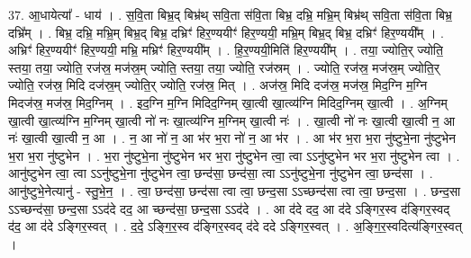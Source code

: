\documentclass[17pt]{extarticle}
\begin{document}
37. आ॒धायेत्या᳚ - धाय॑ । . स॒वि॒ता बिभ्र॒द् बिभ्र॑थ् सवि॒ता स॑वि॒ता बिभ्र॒ दभ्रि॒ मभ्रि॒म् बिभ्र॑थ् सवि॒ता स॑वि॒ता बिभ्र॒ दभ्रि᳚म् । . बिभ्र॒ दभ्रि॒ मभ्रि॒म् बिभ्र॒द् बिभ्र॒ दभ्रिꣳ॑ हिर॒ण्ययीꣳ॑ हिर॒ण्ययी॒ मभ्रि॒म् बिभ्र॒द् बिभ्र॒ दभ्रिꣳ॑ हिर॒ण्ययी᳚म् । . अभ्रिꣳ॑ हिर॒ण्ययीꣳ॑ हिर॒ण्ययी॒ मभ्रि॒ मभ्रिꣳ॑ हिर॒ण्ययी᳚म् । . हि॒र॒ण्ययी॒मिति॑ हिर॒ण्ययी᳚म् । . तया॒ ज्योति॒र् ज्योति॒ स्तया॒ तया॒ ज्योति॒ रज॑स्र॒ मज॑स्र॒म् ज्योति॒ स्तया॒ तया॒ ज्योति॒ रज॑स्रम् । . ज्योति॒ रज॑स्र॒ मज॑स्र॒म् ज्योति॒र् ज्योति॒ रज॑स्र॒ मिदि दज॑स्र॒म् ज्योति॒र् ज्योति॒ रज॑स्र॒ मित् । . अज॑स्र॒ मिदि दज॑स्र॒ मज॑स्र॒ मिद॒ग्नि म॒ग्नि मिदज॑स्र॒ मज॑स्र॒ मिद॒ग्निम् । . इद॒ग्नि म॒ग्नि मिदिद॒ग्निम् खा॒त्वी खा॒त्व्य॑ग्नि मिदिद॒ग्निम् खा॒त्वी । . अ॒ग्निम् खा॒त्वी खा॒त्व्य॑ग्नि म॒ग्निम् खा॒त्वी नो॑ नः खा॒त्व्य॑ग्नि म॒ग्निम् खा॒त्वी नः॑ । . खा॒त्वी नो॑ नः खा॒त्वी खा॒त्वी न॒ आ नः॑ खा॒त्वी खा॒त्वी न॒ आ । . न॒ आ नो॑ न॒ आ भ॑र भ॒रा नो॑ न॒ आ भ॑र । . आ भ॑र भ॒रा भ॒रा नु॑ष्टुभे॒ना नु॑ष्टुभेन भ॒रा भ॒रा नु॑ष्टुभेन । . भ॒रा नु॑ष्टुभे॒ना नु॑ष्टुभेन भर भ॒रा नु॑ष्टुभेन त्वा॒ त्वा ऽऽनु॑ष्टुभेन भर भ॒रा नु॑ष्टुभेन त्वा । . आनु॑ष्टुभेन त्वा॒ त्वा ऽऽनु॑ष्टुभे॒ना नु॑ष्टुभेन त्वा॒ छन्द॑सा॒ छन्द॑सा॒ त्वा ऽऽनु॑ष्टुभे॒ना नु॑ष्टुभेन त्वा॒ छन्द॑सा । . आनु॑ष्टुभे॒नेत्यानु॑ - स्तु॒भे॒न॒ । . त्वा॒ छन्द॑सा॒ छन्द॑सा त्वा त्वा॒ छन्द॒सा ऽऽच्छन्द॑सा त्वा त्वा॒ छन्द॒सा । . छन्द॒सा ऽऽच्छन्द॑सा॒ छन्द॒सा ऽऽद॑दे दद॒ आ च्छन्द॑सा॒ छन्द॒सा ऽऽद॑दे । . आ द॑दे दद॒ आ द॑दे ऽङ्गिर॒स्व द॑ङ्गिर॒स्वद् द॑द॒ आ द॑दे ऽङ्गिर॒स्वत् । . द॒दे॒ ऽङ्गि॒र॒स्व द॑ङ्गिर॒स्वद् द॑दे ददे ऽङ्गिर॒स्वत् । . अ॒ङ्गि॒र॒स्वदित्य॑ङ्गिर॒स्वत् । \newline
\pagebreak
{}
\end{document}

